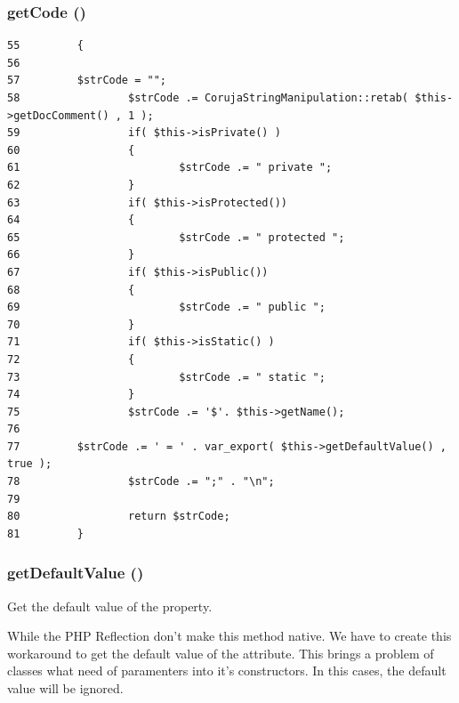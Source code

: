 \hypertarget{class_code_reflection_property_b5e24da53b4a0d0848b18c1e832f47ff}{
\subsubsection[{getCode}]{\setlength{\rightskip}{0pt plus 5cm}getCode ()}}
\label{class_code_reflection_property_b5e24da53b4a0d0848b18c1e832f47ff}




\begin{Code}\begin{verbatim}55         {
56 
57         $strCode = "";
58                 $strCode .= CorujaStringManipulation::retab( $this->getDocComment() , 1 );
59                 if( $this->isPrivate() )
60                 {
61                         $strCode .= " private ";
62                 }
63                 if( $this->isProtected())
64                 {
65                         $strCode .= " protected ";
66                 }
67                 if( $this->isPublic())
68                 {
69                         $strCode .= " public ";
70                 }
71                 if( $this->isStatic() )
72                 {
73                         $strCode .= " static ";
74                 }
75                 $strCode .= '$'. $this->getName();
76 
77         $strCode .= ' = ' . var_export( $this->getDefaultValue() , true );
78                 $strCode .= ";" . "\n";
79 
80                 return $strCode;
81         }
\end{verbatim}
\end{Code}


\hypertarget{class_code_reflection_property_f9b9401c63918169457fe8516324950f}{
\subsubsection[{getDefaultValue}]{\setlength{\rightskip}{0pt plus 5cm}getDefaultValue ()}}
\label{class_code_reflection_property_f9b9401c63918169457fe8516324950f}


Get the default value of the property.

While the PHP Reflection don't make this method native. We have to create this workaround to get the default value of the attribute. This brings a problem of classes what need of paramenters into it's constructors. In this cases, the default value will be ignored.

